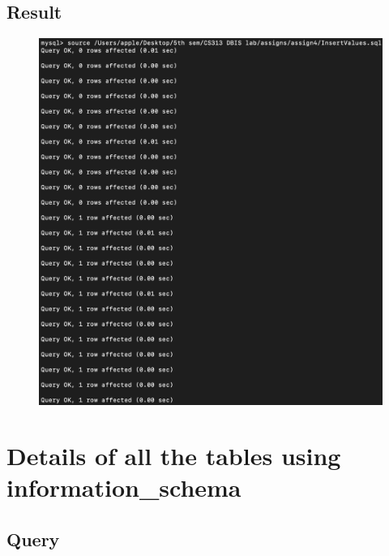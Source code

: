 \documentclass[12pt]{article}
\begin{document}
\subsection{Result}
\begin{figure}[!hbt]
    \centering
    \includegraphics[scale=0.52]{screenshots/5.png}
    \label{fig:my_label1}
\end{figure}

\newpage

\section{Details of all the tables using information\_schema}

\subsection{Query}
\end{document}
